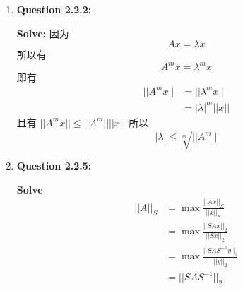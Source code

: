 \documentclass[UTF8]{uofa-eng-assignment}
\begin{document}
\maketitle

\begin{enumerate}

\item \textbf{Question 2.2.2:}

\textbf{Solve:}
因为
$$Ax=\lambda x$$
所以有
$$A^mx=\lambda^m x$$
即有
$$
\begin{aligned}
||A^mx||&=||\lambda^m x||\\
&=|\lambda|^m||x||
\end{aligned}
$$
且有
$||A^mx||\leq||A^m|| ||x||$
所以
$$
|\lambda|\leq \sqrt[m]{||A^m||}
$$
\item \textbf{Question 2.2.5:}

\textbf{Solve}
$$
\begin{aligned}
||A||_S&=\max \frac{||Ax||_S}{||x||_S}\\
&=\max \frac{||SAx||_2}{||Sx||_2}\\
&=\max \frac{||SAS^{-1}y||_2}{||y||_2}\\
&=||SAS^{-1}||_2
\end{aligned}
$$


\end{enumerate}
\end{document}
